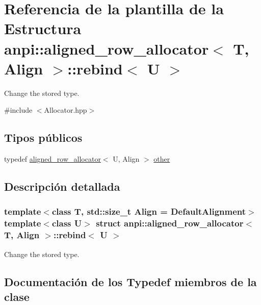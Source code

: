 \hypertarget{structanpi_1_1aligned__row__allocator_1_1rebind}{}\section{Referencia de la plantilla de la Estructura anpi\+:\+:aligned\+\_\+row\+\_\+allocator$<$ T, Align $>$\+:\+:rebind$<$ U $>$}
\label{structanpi_1_1aligned__row__allocator_1_1rebind}


Change the stored type.  




{\ttfamily \#include $<$Allocator.\+hpp$>$}

\subsection*{Tipos públicos}
\begin{DoxyCompactItemize}
\item 
typedef \hyperlink{classanpi_1_1aligned__row__allocator}{aligned\+\_\+row\+\_\+allocator}$<$ U, Align $>$ \hyperlink{structanpi_1_1aligned__row__allocator_1_1rebind_a960ad1a3c52a054030a84078477bdb27}{other}
\end{DoxyCompactItemize}


\subsection{Descripción detallada}
\subsubsection*{template$<$class T, std\+::size\+\_\+t Align = Default\+Alignment$>$\newline
template$<$class U$>$\newline
struct anpi\+::aligned\+\_\+row\+\_\+allocator$<$ T, Align $>$\+::rebind$<$ U $>$}

Change the stored type. 

\subsection{Documentación de los \textquotesingle{}Typedef\textquotesingle{} miembros de la clase}
\mbox{\label{structanpi_1_1aligned__row__allocator_1_1rebind_a960ad1a3c52a054030a84078477bdb27}} 
